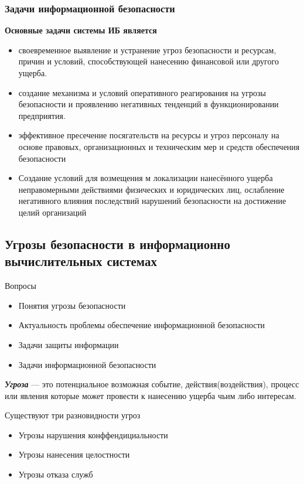 \documentclass[a4paper,14pt]{extarticle}
\begin{document}
	\subsubsection{Задачи информационной безопасности}
	\textbf{Основные задачи системы ИБ является}
	\begin{itemize}
		\item своевременное выявление и устранение угроз безопасности и ресурсам, причин и условий, способствующей нанесению финансовой или другого ущерба.
		\item создание механизма и условий оперативного реагирования на угрозы безопасности и проявлению негативных тенденций в функционировании предприятия.
		\item эффективное пресечение посягательств на ресурсы и угроз персоналу на основе правовых, организационных и техническим мер и средств обеспечения безопасности
		\item Создание условий для возмещения м локализации нанесённого ущерба неправомерными действиями физических и юридических лиц, ослабление негативного влияния последствий нарушений безопасности на достижение целий организаций
	\end{itemize}
	
	\newpage
	\subsection{Угрозы безопасности в информационно вычислительных системах}
	Вопросы
	\begin{itemize}
		\item Понятия угрозы безопасности
		\item Актуальность проблемы обеспечение информационной безопасности
		\item Задачи защиты информации
		\item Задачи информационной безопасности
	\end{itemize}
	
	\textit{\textbf{Угроза}} --- это потенциальное возможная событие, действия(воздействия), процесс или явления которые может провести к нанесению ущерба чьим либо интересам.
	
	Существуют три разновидности угроз
	\begin{itemize}
		\item Угрозы нарушения конффендициальности
		\item Угрозы нанесения целостности
		\item Угрозы отказа служб
	\end{itemize}
	
\end{document}
